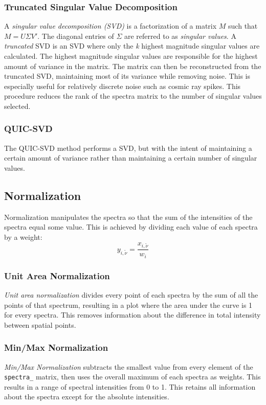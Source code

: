 \documentclass[12pt]{achemso} %
\begin{document}
\subsubsection{Truncated Singular Value Decomposition} A \emph{singular value
decomposition (SVD)} is a factorization of a matrix \(M\) such that
\(M=U{\Sigma}V'\). The diagonal entries of \({\Sigma}\) are referred to as
\emph{singular values}. A \emph{truncated} SVD is an SVD where only the \emph{k}
highest magnitude singular values are calculated. The highest magnitude singular
values are responsible for the highest amount of variance in the matrix. The
matrix can then be reconstructed from the truncated SVD, maintaining most of its
variance while removing noise. This is especially useful for relatively discrete
noise such as cosmic ray spikes. This procedure reduces the rank of the spectra
matrix to the number of singular values selected. 

\subsubsection{QUIC-SVD} The
QUIC-SVD method performs a SVD, but with the intent of maintaining a certain
amount of variance rather than maintaining a certain number of singular values.

\subsection{Normalization} Normalization manipulates the spectra so that the sum
of the intensities of the spectra equal some value. This is achieved by dividing each
value of each spectra by a weight:
\[
y_{i, \tilde{\nu}} = \frac{x_{i, \tilde{\nu}}}{w_i}
\]


\subsubsection{Unit Area Normalization} 
\emph{Unit area normalization} divides
every point of each spectra by the sum of all the points of that spectrum,
resulting in a plot where the area under the curve is 1 for every spectra. This
removes information about the difference in total intensity between spatial
points.

\subsubsection{Min/Max Normalization} 
\emph{Min/Max Normalization} subtracts the smallest value from every
element of the \texttt{spectra\_} matrix, then uses the overall maximum of each spectra as weights. 
This results in a range of spectral intensities from 0 to 1. This retains all information about the spectra except for the
absolute intensities.
\end{document}
